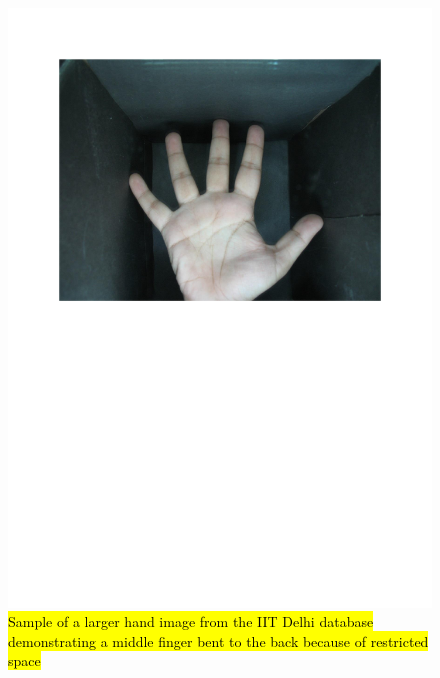\documentclass[review]{elsarticle}
\begin{document}
		\begin{figure}[!h]
			\centering
			\includegraphics[page=2,scale=.57,trim=1cm 14.7cm 1cm 1.7cm,clip]{IIT_problematic.pdf}
			\caption{\hl{Sample of a larger hand image from the IIT Delhi database demonstrating a middle finger bent to the back because of restricted space}}
			\label{fig:IIT_problematic_hand3}
		\end{figure}
\end{document}
